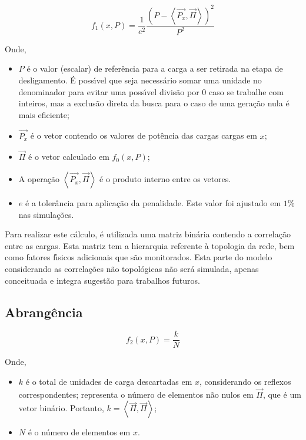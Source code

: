 \begin{equation} \label{eq:f1}
	f_{1} \left( x, P \right) = \frac{1}{e^{2}} \frac{\left( P - \left< \vec{P_{x}}, \vec{\Pi} \right> \right)^{2}}{P^{2}}
\end{equation}

Onde,

\begin{itemize}
	\item[] $ P $ {\'e} o valor (escalar) de refer{\^e}ncia para a carga a ser retirada na etapa de desligamento. \'{E} poss{\'\i}vel que seja necess{\'a}rio somar uma unidade no denominador para evitar uma poss{\'\i}vel divis{\~a}o por $0$ caso se trabalhe com inteiros, mas a exclus{\~a}o direta da busca para o caso de uma gera{\c c}{\~a}o nula {\'e} mais eficiente;
	\item[] $ \vec{P_{x}} $ {\'e} o vetor contendo os valores de pot{\^e}ncia das cargas cargas em $x$;
	\item[] $ \vec{\Pi} $ {\'e} o vetor calculado em $f_{0}\left(x, P \right)$;
	\item[] A opera{\c c}{\~a}o $\left< \vec{P_{x}}, \vec{\Pi} \right>$ {\'e} o produto interno entre os vetores.
	\item[] $ e $ {\'e} a toler{\^a}ncia para aplica{\c c}{\~a}o da penalidade. Este valor foi ajustado em $1\%$ nas simula{\c c}{\~o}es.
\end{itemize}

Para realizar este c{\'a}lculo, {\'e} utilizada uma matriz bin{\'a}ria contendo a correla{\c c}{\~a}o entre as cargas. Esta matriz tem a hierarquia referente {\`a} topologia da rede, bem como fatores f{\'\i}sicos adicionais que s{\~a}o monitorados. Esta parte do modelo considerando as correla{\c c}{\~o}es n{\~a}o topol{\'o}gicas n{\~a}o ser{\'a} simulada, apenas conceituada e integra sugest{\~a}o para trabalhos futuros.

\subsection{Abrang{\^e}ncia} \label{subsec:f2}

\begin{equation} \label{eq:f2}
	f_{2} \left( x, P \right) = \frac{k}{N}
\end{equation}

Onde,

\begin{itemize}
	\item[] $ k $ {\'e} o total de unidades de carga descartadas em $x$, considerando os reflexos correspondentes; representa o n{\'u}mero de elementos n{\~a}o nulos em $\vec{\Pi}$, que {\'e} um vetor bin{\'a}rio. Portanto, $k = \left< \vec{\Pi}, \vec{\Pi} \right>$;
	\item[] $ N $ {\'e} o n{\'u}mero de elementos em $x$.
\end{itemize}

